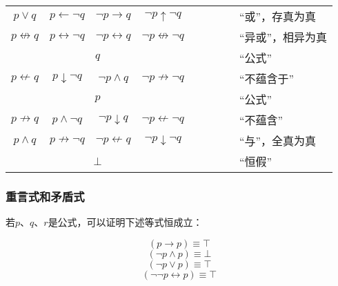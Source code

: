 \begin{table}[h!]
\begin{tabular}{c c c c c c c c l}
        $p\lor{}q$                & $p\gets\lnot{}q$               & $\lnot{}p\to{}q$                 & $\lnot{}p\uparrow\lnot{}q$            & \F   & \T   & \T   & \T    & ``或''，存真为真         \\
        $p\not\leftrightarrow{}q$ & $p\leftrightarrow\lnot{}q$     & $\lnot{}p\leftrightarrow{}q$     & $\lnot{}p\not\leftrightarrow\lnot{}q$ & \F   & \T   & \T   & \F    & ``异或''，相异为真       \\
        \multicolumn{4}{c}{$q$}                                                                                                               & \F   & \T   & \F   & \T    & ``公式''                 \\
        $p\not\gets{}q$           & $p\downarrow\lnot{}q$          & $\lnot{}p\land{}q$               & $\lnot{}p\not\to\lnot{}q$             & \F   & \T   & \F   & \F    & ``不蕴含于''             \\
        \multicolumn{4}{c}{$p$}                                                                                                               & \F   & \F   & \T   & \T    & ``公式''                 \\
        $p\not\to{}q$             & $p\land\lnot{}q$               & $\lnot{}p\downarrow{}q$          & $\lnot{}p\not\gets\lnot{}q$           & \F   & \F   & \T   & \F    & ``不蕴含''               \\
        $p\land{}q$               & $p\not\to\lnot{}q$             & $\lnot{}p\not\gets{}q$           & $\lnot{}p\downarrow\lnot{}q$          & \F   & \F   & \F   & \T    & ``与''，全真为真         \\
        \multicolumn{4}{c}{$\bot$}                                                                                                            & \F   & \F   & \F   & \F    & ``恒假''                 \\
        \hline
    \end{tabular}
\end{table}

\subsubsection{重言式和矛盾式}

若$p$、$q$、$r$是公式，可以证明下述等式恒成立：

\[ (p \to p)                                                               \equiv \top \tag{同一律} \]
\[ (\lnot{}p \land p)                                                      \equiv \bot \tag{矛盾律} \]
\[ (\lnot{}p \lor p)                                                       \equiv \top \tag{排中律} \]
\[ (\lnot\lnot{}p \leftrightarrow p)                                       \equiv \top \tag{双重否定律} \]

